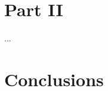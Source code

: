\begin{comment}
Expected value of the future service.

EL límite alto en el software está marcado por el servicio futuro que me ofrece, mirando hacia adelante no lo que ha hecho hasta ese momento. Estabilidad del software, soporte, documentación, adaptación o como se puede conseguir una certificación. A diferencia de los bienes físicos no se piensa en cuanto se puede conseguir el mismo producto actualizado mientras que en un físico si que se mira atrás.

    Services == Source of revenues

In Software you don't purchase the product , you evaluate the service that product offers.

The organization of Free Software model allows offering best services:
\begin{itemize}
    \item Users who become clients.
    \item Scalability in failure identification. Successful programs use to have less errors, where success measured in user.
    \item Share risks and production costs. Development cost is shared among the actors.
    \item Monopolistic practices are very difficult. A fork allows to escape from product monopolization.
\end{itemize}

\emph{If you don't have users , you don't have any available business model.}
\end{comment}

\section{Part II}\label{Part II} %

...

\section{Conclusions}\label{conclusions}
